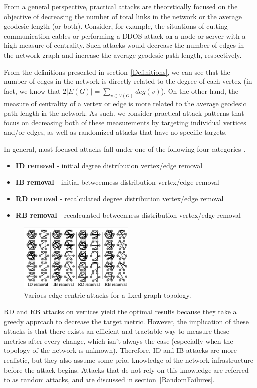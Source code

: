 \documentclass[doc]{apa}%
\begin{document}
From a general perspective, practical attacks are theoretically focused on the objective of decreasing the number of total links in the network or the average geodesic length (or both). Consider, for example, the situations of cutting communication cables or performing a DDOS attack on a node or server with a high measure of centrality. Such attacks would decrease the number of edges in the network graph and increase the average geodesic path length, respectively. 

From the definitions presented in section~\ref{Definitions}, we can see that the number of edges in the network is directly related to the degree of each vertex (in fact, we know that $2|E(G)| =\sum_{v \in V(G)}deg(v)$). On the other hand, the measure of centrality of a vertex or edge is more related to the average geodesic path length in the network. As such, we consider practical attack patterns that focus on decreasing both of these measurements by targeting individual vertices and/or edges, as well as randomized attacks that have no specific targets. 

In general, most focused attacks fall under one of the following four categories \cite{Attacks}.
\begin{itemize}
	\item \textbf{ID removal} - initial degree distribution vertex/edge removal
	\item \textbf{IB removal} - initial betweenness distribution vertex/edge removal
	\item \textbf{RD removal} - recalculated degree distribution vertex/edge removal
	\item \textbf{RB removal} - recalculated betweenness distribution vertex/edge removal
\end{itemize}

\begin{figure}[h!]
	\label{fig:Onion}
	\centering
		\includegraphics[width=0.5\textwidth]{edge_attacks.png}
	\caption{Various edge-centric attacks for a fixed graph topology.}
\end{figure}

RD and RB attacks on vertices yield the optimal results because they take a greedy approach to decrease the target metric. However, the implication of these attacks is that there exists an efficient and tractable way to measure these metrics after every change, which isn't always the case (especially when the topology of the network is unknown). Therefore, ID and IB attacks are more realistic, but they also assume some prior knowledge of the network infrastructure before the attack begins. Attacks that do not rely on this knowledge are referred to as random attacks, and are discussed in section~\ref{RandomFailures}.
\end{document}
